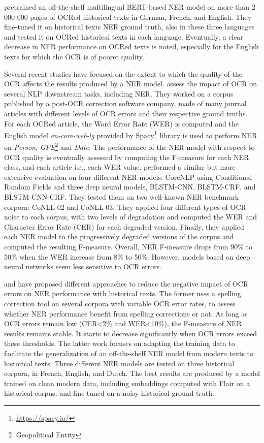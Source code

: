 \cite{Labusch2020NamedED} pretrained an off-the-shelf multilingual BERT-based NER model on more than 2 000 000 pages of OCRed historical texts in German, French, and English. They fine-tuned it on historical texts NER ground truth, also in these three languages and tested it on OCRed historical texts in each language.
Eventually, a clear decrease in NER performance on OCRed texts is noted, especially for the English texts for which the OCR is of poorer quality. 

Several recent studies have focused on the extent to which the quality of the OCR affects the results produced by a NER model.
\cite{van2020assessing} assess the impact of OCR on several NLP downstream tasks, including NER. They worked on a corpus published by a post-OCR correction software company, made of many journal articles with different levels of OCR errors and their respective ground truths.
For each OCRed article, the Word Error Rate (WER) is computed and the English model \textit{en-core-web-lg} provided by Spacy\footnote{\url{https://spacy.io/}} library is used to perform NER on \textit{Person}, \textit{GPE}\footnote{Geopolitical Entity} and \textit{Date}.
The performance of the NER model with respect to OCR quality is eventually assessed by computing the F-measure for each NER class, and each article i.e., each WER value.
\cite{hamdi2020assessing} performed a similar but more extensive evaluation on four different NER models: CoreNLP using Conditional Random Fields and three deep neural models, BLSTM-CNN, BLSTM-CRF, and BLSTM-CNN-CRF.
They tested them on two well-known NER benchmark corpora: CoNLL-02 and CoNLL-03. They applied four different types of OCR noise to each corpus, with two levels of degradation and computed the WER and Character Error Rate (CER) for each degraded version.
Finally, they applied each NER model to the progressively degraded versions of the corpus and computed the resulting F-measure.
Overall, NER F-measure drops from 90\% to 50\% when the WER increase from 8\% to 50\%. However, models based on deep neural networks seem less sensitive to OCR errors.

\cite{huynh2020use} and \cite{marz2021data} have proposed different approaches to reduce the negative impact of OCR errors on NER performance with historical texts.
The former uses a spelling correction tool on several corpora with variable OCR error rates, to assess whether NER performance benefit from spelling corrections or not.
As long as OCR errors remain low (CER<2\% and WER<10\%), the F-measure of NER results remains stable.
It starts to decrease significantly when OCR errors exceed these thresholds.
The latter work focuses on adapting the training data to facilitate the generalization of an off-the-shelf NER model from modern texts to historical texts.
Three different NER models are tested on three historical corpora, in French, English, and Dutch. The best results are produced by a model trained on clean modern data, including embeddings computed with Flair on a historical corpus, and fine-tuned on a noisy historical ground truth.

